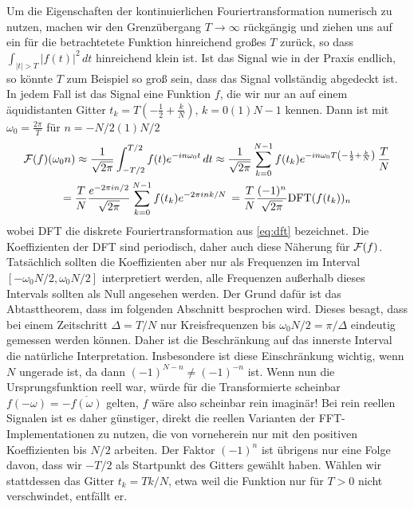 Um die Eigenschaften der kontinuierlichen Fouriertransformation
numerisch zu nutzen, machen wir den Grenzübergang $T\to\infty$
rückgängig und ziehen uns auf ein für die betrachtetete Funktion
hinreichend großes $T$ zurück, so dass $\int_{\lvert t\rvert>T}\lvert
f(t)\rvert^2\, dt$ hinreichend klein ist. Ist das Signal wie in der
Praxis endlich, so könnte $T$ zum Beispiel so groß sein, dass das
Signal vollständig abgedeckt ist. In jedem Fall ist das Signal eine
Funktion $f$, die wir nur an auf einem äquidistanten Gitter $t_k =
T\left(-\frac{1}{2} + \frac{k}{N}\right)$, $k=0(1)N-1$ kennen. Dann
ist mit $\omega_0=\frac{2\pi}{T}$ für $n=-N/2(1)N/2$
\begin{multline}
  \label{eq:dftcont}
  \mathcal F(f)(\omega_0 n)\approx
  \frac{1}{\sqrt{2\pi}}\int_{-T/2}^{T/2} f(t)e^{-i n \omega_0 t}\, dt
  \approx
  \frac{1}{\sqrt{2\pi}}\sum_{k=0}^{N-1}
  f(t_k)
  e^{-i n\omega_0 T\left(-\frac{1}{2} + \frac{k}{N}\right)}\,
  \frac{T}{N}\\
  =   \frac{T}{N} \frac{e^{-2\pi i n /2}}{\sqrt{2\pi}}\sum_{k=0}^{N-1}
  f(t_k) e^{-2\pi i n k / N}\,
  =\frac{T}{N}\frac{(-1)^n}{\sqrt{2\pi}} \text{DFT}(f(t_k))_n
\end{multline}
wobei DFT die diskrete Fouriertransformation aus \eqref{eq:dft}
bezeichnet.  Die Koeffizienten der DFT sind periodisch, daher auch
diese Näherung für $\mathcal F(f)$. Tatsächlich sollten die Koeffizienten
aber nur als Frequenzen im Interval $[-\omega_0 N/2,\omega_0 N/2]$
interpretiert werden, alle Frequenzen außerhalb dieses Intervals
sollten als Null angesehen werden. Der Grund dafür ist das
Abtasttheorem, dass im folgenden Abschnitt besprochen wird. Dieses
besagt, dass bei einem Zeitschritt $\Delta=T/N$ nur Kreisfrequenzen
bis $\omega_0 N/2 = \pi/\Delta$ eindeutig gemessen werden
können. Daher ist die Beschränkung auf das innerste Interval die
natürliche Interpretation. Insbesondere ist diese Einschränkung
wichtig, wenn $N$ ungerade ist, da dann $(-1)^{N-n}\neq (-1)^{-n}$
ist. Wenn nun die Ursprungsfunktion reell war, würde für die
Transformierte scheinbar $f(-\omega)=-\overline{f(\omega)}$ gelten,
$f$ wäre also scheinbar rein imaginär! Bei rein reellen Signalen ist
es daher günstiger, direkt die reellen Varianten der
FFT-Implementationen zu nutzen, die von vorneherein nur mit den
positiven Koeffizienten bis $N/2$ arbeiten. Der Faktor $(-1)^n$ ist
übrigens nur eine Folge davon, dass wir $-T/2$ als Startpunkt des
Gitters gewählt haben. Wählen wir stattdessen das Gitter $t_k=Tk/N$,
etwa weil die Funktion nur für $T>0$ nicht verschwindet, entfällt er.

